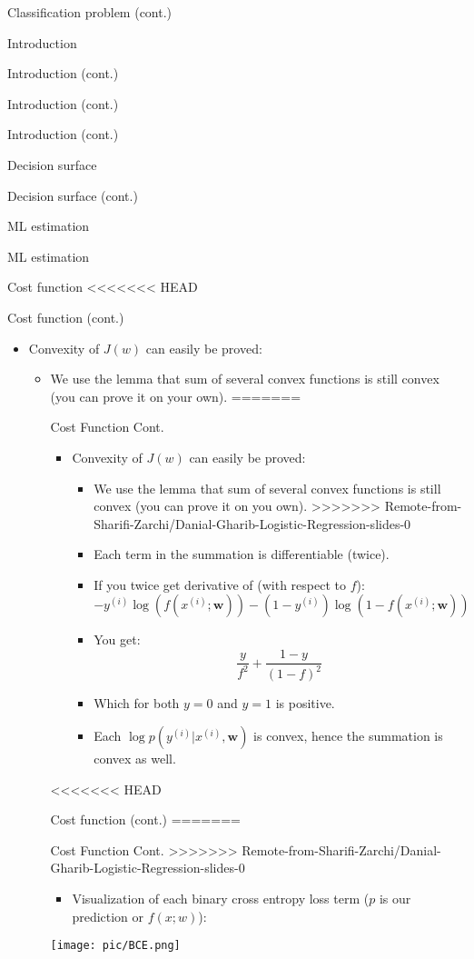 \documentclass[serif, aspectratio=169]{beamer}
\begin{document}
\begin{frame}{Classification problem (cont.)}
\begin{itemize}
\begin{frame}{Introduction}
\begin{itemize}
\begin{frame}{Introduction (cont.)}
\begin{frame}{Introduction (cont.)}
\begin{frame}{Introduction (cont.)}
\begin{frame}{Decision surface}
\begin{itemize}
\begin{frame}{Decision surface (cont.)}
\begin{frame}{ML estimation}
\begin{frame}{ML estimation}
\begin{itemize}
\begin{frame}{Cost function}
<<<<<<< HEAD
\begin{frame}{Cost function (cont.)}
    \begin{itemize}
    \item Convexity of $J(w)$ can easily be proved:
        \begin{itemize}
            \item We use the lemma that sum of several convex functions is still convex (you can prove it on your own).
=======
\begin{frame}{Cost Function Cont.}
    \begin{itemize}
    \item Convexity of $J(w)$ can easily be proved:
        \begin{itemize}
            \item We use the lemma that sum of several convex functions is still convex (you can prove it on you own).
>>>>>>> Remote-from-Sharifi-Zarchi/Danial-Gharib-Logistic-Regression-slides-0
            \item Each term in the summation is differentiable (twice).
            \item If you twice get derivative of (with respect to $f$):
                \[
                    -y^{(i)}\log (f(x^{(i)}; \mathbf{w})) - 
            (1-y^{(i)})\log (1 - f(x^{(i)}; \mathbf{w}))
                \]
            \item You get:
                \[
                    \frac{y}{f^2} + \frac{1-y}{(1-f)^2}
                \]
            \item Which for both $y=0$ and $y=1$ is positive.
            \item Each $\log p(y^{(i)}|x^{(i)}, \mathbf{w})$ is convex, hence the summation is convex as well.
        \end{itemize}
    \end{itemize}
\end{frame}
<<<<<<< HEAD
\begin{frame}{Cost function (cont.)}
=======
\begin{frame}{Cost Function Cont.}
>>>>>>> Remote-from-Sharifi-Zarchi/Danial-Gharib-Logistic-Regression-slides-0
    \begin{itemize}
    \item Visualization of each binary cross entropy loss term ($p$ is our prediction or $f(x;w)$):
    \end{itemize}
    \begin{center}
        \texttt{[image: pic/BCE.png]}

\end{center}
\end{frame}
\end{frame}
\end{itemize}
\end{itemize}
\end{frame}
\end{frame}
\end{itemize}
\end{frame}
\end{frame}
\end{frame}
\end{itemize}
\end{frame}
\end{frame}
\end{frame}
\end{frame}
\end{itemize}
\end{frame}
\end{itemize}
\end{frame}
\end{document}
